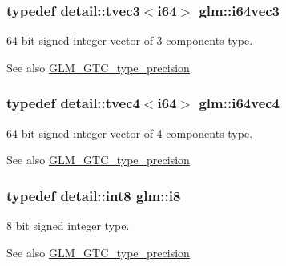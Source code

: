 \subsubsection[{i64vec3}]{\setlength{\rightskip}{0pt plus 5cm}typedef detail\+::tvec3$<$i64$>$ {\bf glm\+::i64vec3}}\label{group__gtc__type__precision_gaefca6f789bc2d5150fe594a9aa687840}
64 bit signed integer vector of 3 components type. \begin{DoxySeeAlso}{See also}
\hyperlink{group__gtc__type__precision}{G\+L\+M\+\_\+\+G\+T\+C\+\_\+type\+\_\+precision} 
\end{DoxySeeAlso}
\hypertarget{group__gtc__type__precision_ga3f5fbc11fb153fa47a858e25ccf1ad27}{}
\subsubsection[{i64vec4}]{\setlength{\rightskip}{0pt plus 5cm}typedef detail\+::tvec4$<$i64$>$ {\bf glm\+::i64vec4}}\label{group__gtc__type__precision_ga3f5fbc11fb153fa47a858e25ccf1ad27}
64 bit signed integer vector of 4 components type. \begin{DoxySeeAlso}{See also}
\hyperlink{group__gtc__type__precision}{G\+L\+M\+\_\+\+G\+T\+C\+\_\+type\+\_\+precision} 
\end{DoxySeeAlso}
\hypertarget{group__gtc__type__precision_gaae064be68b7d36cd7910c16e8ad18bba}{}
\subsubsection[{i8}]{\setlength{\rightskip}{0pt plus 5cm}typedef detail\+::int8 {\bf glm\+::i8}}\label{group__gtc__type__precision_gaae064be68b7d36cd7910c16e8ad18bba}
8 bit signed integer type. \begin{DoxySeeAlso}{See also}
\hyperlink{group__gtc__type__precision}{G\+L\+M\+\_\+\+G\+T\+C\+\_\+type\+\_\+precision} 
\end{DoxySeeAlso}
\hypertarget{group__gtc__type__precision_ga7d8b7cc439e81d9deef1477dcbe4bd0b}{}
